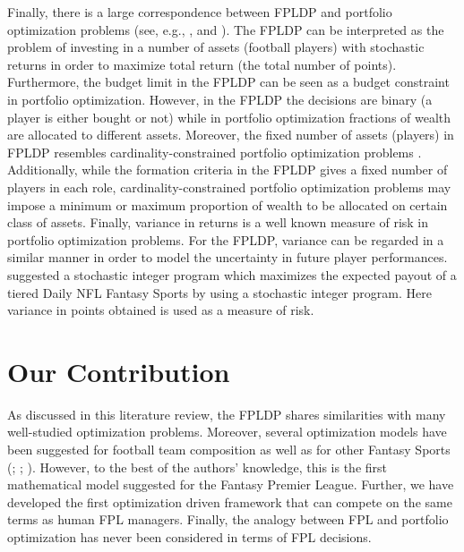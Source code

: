 \newpar

Finally, there is a large correspondence between FPLDP and portfolio optimization problems (see, e.g., \cite{Markowitz}, \cite{Zenios} and \cite{Speranza}). The FPLDP can be interpreted as the problem of investing in a number of assets (football players) with stochastic returns in order to maximize total return (the total number of points). Furthermore, the budget limit in the FPLDP can be seen as a budget constraint in portfolio optimization. However, in the FPLDP the decisions are binary (a player is either bought or not) while in portfolio optimization fractions of wealth are allocated to different assets. Moreover, the fixed number of assets (players) in FPLDP resembles cardinality-constrained portfolio optimization problems \citep{Chang}. Additionally, while the formation criteria in the FPLDP gives a fixed number of players in each role, cardinality-constrained portfolio optimization problems may impose a minimum or maximum proportion of wealth to be allocated on certain class of assets. Finally, variance in returns is a well known measure of risk in portfolio optimization problems. For the FPLDP, variance can be regarded in a similar manner in order to model the uncertainty in future player performances. \cite{Dailyfantasysports} suggested a stochastic integer program which maximizes the expected payout of a tiered Daily NFL Fantasy Sports by using a stochastic integer program. Here variance in points obtained is used as a measure of risk.



\section{Our Contribution}

As discussed in this literature review, the FPLDP shares similarities with many well-studied optimization problems. Moreover, several optimization models have been suggested for football team composition as well as for other Fantasy Sports (\cite{Fry}; \cite{Gibson}; \cite{Becker}). However, to the best of the authors' knowledge, this is the first mathematical model suggested for the Fantasy Premier League. Further, we have developed the first optimization driven framework that can compete on the same terms as human FPL managers. Finally, the analogy between FPL and portfolio optimization has never been considered in terms of FPL decisions.